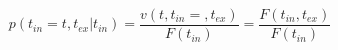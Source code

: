 \begin{equation}
p(t_{in}=t,t_{ex}|t_{in})  = \frac{v(t,t_{in}=,t_{ex})}{F(t_{in})}= \frac{F(t_{in},t_{ex})}{F(t_{in})}
\end{equation}
